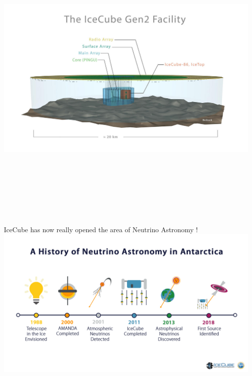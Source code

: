 \Tr
\onecolumn
\begin{center}
\includegraphics[keepaspectratio,height=15cm]{icecube-gen2}
\end{center}

\Tr
\onecolumn
\begin{center}
{\blue IceCube has now really opened the area of Neutrino Astronomy !}\\[3mm]
\includegraphics[keepaspectratio,width=26cm]{IC-timeline}
\end{center}

